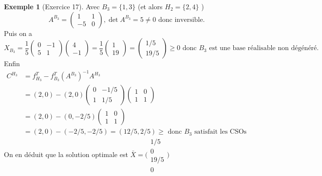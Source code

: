 \documentclass{article}
\theoremstyle{plain}%
\theoremstyle{definition}
\newtheorem{exmp}{Exemple}[section]
\theoremstyle{remark}
\begin{document}
\begin{exmp}[Exercice 17]
    Avec  $ B_3 = \{1,3\} $ (et alors $ H_2=\{2,4\} $ )
    \[
        A^{B_3} = \begin{pmatrix} 1 & 1 \\ -5 & 0\end{pmatrix}, \det A^{B_3} = 5 \neq 0 \text{ donc inversible}
    .\]
    Puis on a 
    \[
        X_{B_3} = \frac{1}{5}\begin{pmatrix}0 & -1 \\5 & 1 \end{pmatrix} \begin{pmatrix}4 \\-1 \end{pmatrix} = \frac{1}{5}\begin{pmatrix} 1 \\ 19 \end{pmatrix} = \begin{pmatrix} 1/5 \\ 19/5 \end{pmatrix} \geq 0 \text{ donc } B_3 \text{ est une base réalisable non dégénéré}
    .\]
    Enfin 
    \begin{align*}
        C^{H_3} &= f^T_{H_3} - f^T_{B_3} (A^{B_3})^{-1} A^{H_3} \\
                &= (2,0) - (2,0) \begin{pmatrix}
                    0 & -1/5 \\
                    1 & 1/5 
                \end{pmatrix} \begin{pmatrix}
                    1 & 0 \\
                    1 & 1
                \end{pmatrix} \\
                &= (2,0) - (0, -2/5)\begin{pmatrix}
                    1 & 0 \\  1 & 1
                \end{pmatrix} \\
                &= (2, 0) - (-2/5, -2/5) = (12/5, 2/5) \geq \text{ donc } B_3 \text{ satisfait les CSOs }
    \end{align*}
    On en déduit que la solution optimale est $ \bar{X} = \big(\begin{smallmatrix}
        1/5 \\
        0 \\ 19/5 \\ 0
    \end{smallmatrix}\big)$ 
\end{exmp}
\end{document}

